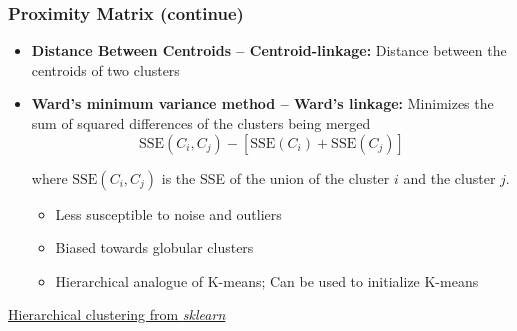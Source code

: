 \documentclass[aspectratio=169, 10pt]{beamer}
\begin{document}
\begin{frame}
    \frametitle{Proximity Matrix (continue)}

    \begin{itemize}
        \item \textbf{Distance Between Centroids -- Centroid-linkage:} Distance between the centroids of two clusters
        \item \textbf{Ward's minimum variance method -- Ward's linkage:} Minimizes the sum of squared differences of the clusters being merged
            \begin{equation*}
                \text{SSE}(C_i, C_j) - [\text{SSE}(C_i) + \text{SSE}(C_j)]
            \end{equation*}

            where $\text{SSE}(C_i, C_j)$ is the SSE of the union of the cluster $i$ and the cluster $j$.
            \begin{itemize}
                \item Less susceptible to noise and outliers
                \item Biased towards globular clusters
                \item Hierarchical analogue of K-means; Can be used to initialize K-means
            \end{itemize}
    \end{itemize}
    
    \begin{example}
        \href{https://scikit-learn.org/stable/modules/clustering.html\#hierarchical-clustering}{Hierarchical clustering from \textit{sklearn}}
    \end{example}
\end{frame}
\end{document}
